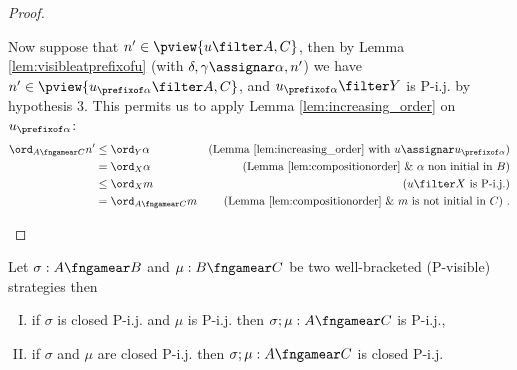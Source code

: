 \begin{proof}
\begin{enumerate}[i.]
Now suppose that $n' \in \pview{u\filter A,C}$,
then by Lemma \ref{lem:visibleatprefixofu}
(with $\delta,\gamma \assignar \alpha,n'$)
we have $n' \in \pview{u_{\prefixof \alpha}\filter A,C}$,
and $u_{\prefixof \alpha}\filter Y$ is P-i.j. by hypothesis 3. This permits us to apply Lemma \ref{lem:increasing_order} on $u_{\prefixof \alpha}$:
\begin{align*}
\ord_{A\fngamear C} n'
& \leq \ord_{Y} \alpha & \mbox{(Lemma \ref{lem:increasing_order} with $u\assignar u_{\prefixof \alpha}$)} \\
& = \ord_{X} \alpha & \mbox{(Lemma \ref{lem:compositionorder} \& $\alpha$ non initial in $B$)} \\
& \leq \ord_{X} m & \mbox{($u \filter X$ is P-i.j.)} \\
& = \ord_{A\fngamear C} m & \mbox{(Lemma \ref{lem:compositionorder} \& $m$ is not initial in $C$)} \ .
\end{align*}
\end{enumerate}
\end{proof}


\begin{proposition}
\label{prop:closedpijcompose} Let $\sigma : A \fngamear B$ and $\mu
: B \fngamear C$ be two well-bracketed (P-visible) strategies then
\begin{enumerate}[(I)]
\item if $\sigma$ is closed P-i.j. and $\mu$ is P-i.j.
then $\sigma ; \mu : A \fngamear C$ is P-i.j.,
\item if $\sigma$ and $\mu$ are closed P-i.j.
then $\sigma ; \mu : A \fngamear C$ is closed P-i.j.
\end{enumerate}
\end{proposition}


